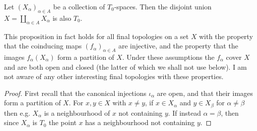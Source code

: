 \documentclass[article, a4paper, 11pt, oneside]{memoir}
\numberwithin{equation}{chapter}
\begin{document}
\begin{proposition}
    \label{thm:T0-disjoint-union}
    Let $(X_\alpha)_{\alpha \in A}$ be a collection of $T_0$-spaces. Then the disjoint union $X = \coprod_{\alpha \in A} X_\alpha$ is also $T_0$. %
\end{proposition}
%
This proposition in fact holds for all final topologies on a set $X$ with the property that the coinducing maps $(f_\alpha)_{\alpha \in A}$ are injective, and the property that the images $f_\alpha(X_\alpha)$ form a partition of $X$. Under these assumptions the $f_\alpha$ cover $X$ and are both open and closed (the latter of which we shall not use below). I am not aware of any other interesting final topologies with these properties.

\begin{proof}
    First recall that the canonical injections $\iota_\alpha$ are open, and that their images form a partition of $X$. For $x,y \in X$ with $x \neq y$, if $x \in X_\alpha$ and $y \in X_\beta$ for $\alpha \neq \beta$ then e.g. $X_\alpha$ is a neighbourhood of $x$ not containing $y$. If instead $\alpha = \beta$, then since $X_\alpha$ is $T_0$ the point $x$ has a neighbourhood not containing $y$.
\end{proof}




\end{document}
